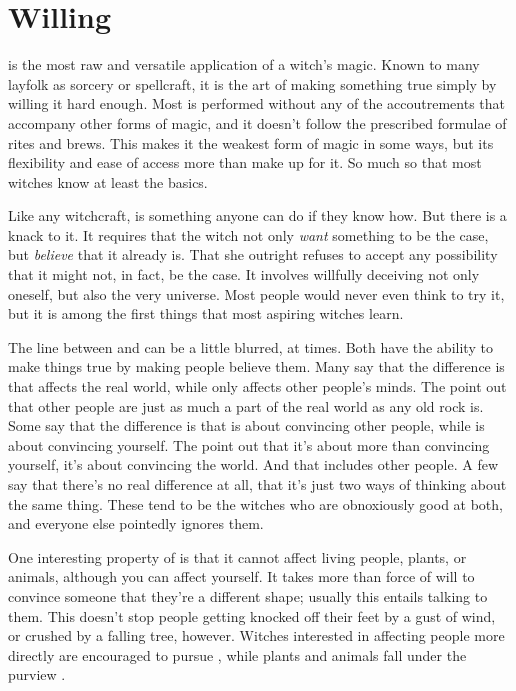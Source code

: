 \chapter{Willing}

 is the most raw and versatile application of a witch's magic.
Known to many layfolk as sorcery or spellcraft, it is the art of making something true simply by willing it hard enough.
Most  is performed without any of the accoutrements that accompany other forms of magic, and it doesn't follow the prescribed formulae of rites and brews.
This makes it the weakest form of magic in some ways, but its flexibility and ease of access more than make up for it.
So much so that most witches know at least the basics.

Like any witchcraft,  is something anyone can do if they know how.
But there is a knack to it.
It requires that the witch not only \emph{want} something to be the case, but \emph{believe} that it already is.
That she outright refuses to accept any possibility that it might not, in fact, be the case.
It involves willfully deceiving not only oneself, but also the very universe.
Most people would never even think to try it, but it is among the first things that most aspiring witches learn.

The line between  and  can be a little blurred, at times.
Both have the ability to make things true by making people believe them.
Many 	 say that the difference is that  affects the real world, while  only affects other people's minds.
The  point out that other people are just as much a part of the real world as any old rock is.
Some  say that the difference is that  is about convincing other people, while  is about convincing yourself.
The  point out that it's about more than convincing yourself, it's about convincing the world.
And that includes other people.
A few say that there's no real difference at all, that it's just two ways of thinking about the same thing.
These tend to be the witches who are obnoxiously good at both, and everyone else pointedly ignores them.

One interesting property of  is that it cannot affect living people, plants, or animals, although you can affect yourself.
It takes more than force of will to convince someone that they're a different shape; usually this entails talking to them.
This doesn't stop people getting knocked off their feet by a gust of wind, or crushed by a falling tree, however.
Witches interested in affecting people more directly are encouraged to pursue , while plants and animals fall under the purview .

